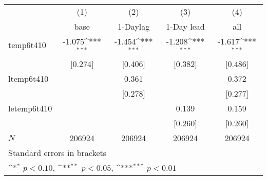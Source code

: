 {
\def\sym#1{\ifmmode^{#1}\else\(^{#1}\)\fi}
\begin{tabular}{l*{4}{c}}
\hline\hline
            &\multicolumn{1}{c}{(1)}&\multicolumn{1}{c}{(2)}&\multicolumn{1}{c}{(3)}&\multicolumn{1}{c}{(4)}\\
            &\multicolumn{1}{c}{base}&\multicolumn{1}{c}{1-Daylag}&\multicolumn{1}{c}{1-Day lead}&\multicolumn{1}{c}{all}\\
\hline
temp6t410   &      -1.075\sym{***}&      -1.454\sym{***}&      -1.208\sym{***}&      -1.617\sym{***}\\
            &     [0.274]         &     [0.406]         &     [0.382]         &     [0.486]         \\
[1em]
ltemp6t410  &                     &       0.361         &                     &       0.372         \\
            &                     &     [0.278]         &                     &     [0.277]         \\
[1em]
letemp6t410 &                     &                     &       0.139         &       0.159         \\
            &                     &                     &     [0.260]         &     [0.260]         \\
\hline
\(N\)       &      206924         &      206924         &      206924         &      206924         \\
\hline\hline
\multicolumn{5}{l}{\footnotesize Standard errors in brackets}\\
\multicolumn{5}{l}{\footnotesize \sym{*} \(p<0.10\), \sym{**} \(p<0.05\), \sym{***} \(p<0.01\)}\\
\end{tabular}
}
